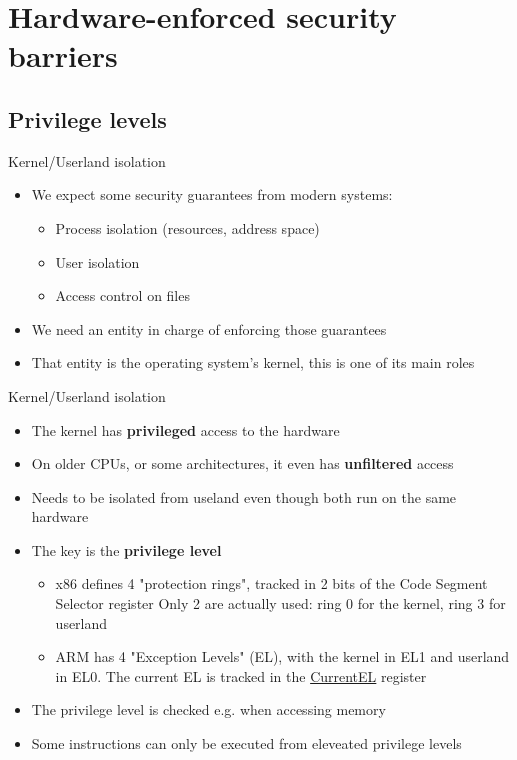 \section{Hardware-enforced security barriers}

\subsection{Privilege levels}

\begin{frame}{Kernel/Userland isolation}
  \begin{itemize}
    \item We expect some security guarantees from modern systems:
    \begin{itemize}
      \item Process isolation (resources, address space)
      \item User isolation
      \item Access control on files
    \end{itemize}
    \item We need an entity in charge of enforcing those guarantees
    \item That entity is the operating system's kernel, this is one of its main roles
  \end{itemize}
\end{frame}


\begin{frame}{Kernel/Userland isolation}
  \begin{itemize}
    \item The kernel has \textbf{privileged} access to the hardware
    \item On older CPUs, or some architectures, it even has \textbf{unfiltered} access
    \item Needs to be isolated from useland even though both run on the same hardware
    \item The key is the \textbf{privilege level}
    \begin{itemize}
      \item x86 defines 4 "protection rings", tracked in 2 bits of the Code Segment Selector register
            Only 2 are actually used: ring 0 for the kernel, ring 3 for userland
      \item ARM has 4 "Exception Levels" (EL), with the kernel in EL1 and userland in EL0.
            The current EL is tracked in the \href{https://developer.arm.com/documentation/ddi0595/2021-06/AArch64-Registers/CurrentEL--Current-Exception-Level}{CurrentEL}
 register
    \end{itemize}
  \item The privilege level is checked e.g. when accessing memory
  \item Some instructions can only be executed from eleveated privilege levels
  \end{itemize}
\end{frame}

